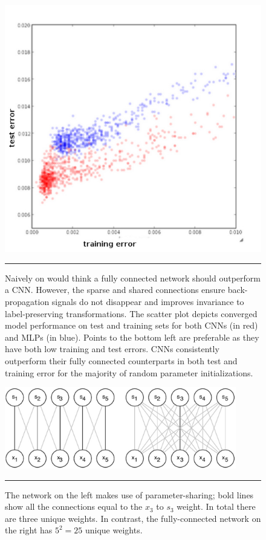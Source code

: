\begin{figure}[htbp]
	\centering
		\includegraphics[width = 1.0\textwidth]{./Figures/effects_of_hyperpram_on_SGD_Bruel_CNN_Sparsity.jpg} %
		\rule{35em}{0.5pt}
	\caption[CNN vs. Fully Connected]{Naively on would think a fully connected network should outperform a CNN. However, the sparse and shared connections ensure back-propagation signals do not disappear and improves invariance to label-preserving transformations. The scatter plot depicts converged model performance on test and training sets for both CNNs (in red) and MLPs (in blue). Points to the bottom left are preferable as they have both low training and test errors. CNNs consistently outperform their fully connected counterparts in both test and training error for the majority of random parameter initializations.}
	\label{fig:Sparsity}
\end{figure}
\begin{figure}[htbp]
		\centering
			\includegraphics[width = 0.9\textwidth]{./Figures/parameter_sharing_DL_textbook_2.jpg} %
			\rule{35em}{0.5pt}
		\caption[Parameter Sharing]{The network on the left makes use of parameter-sharing; bold lines show all the connections equal to the $x_3$ to $s_3$ weight. In total there are three unique weights. In contrast, the fully-connected network on the right has $5^2 = 25$ unique weights.}
		\label{fig:parameter_sharing}
\end{figure}


